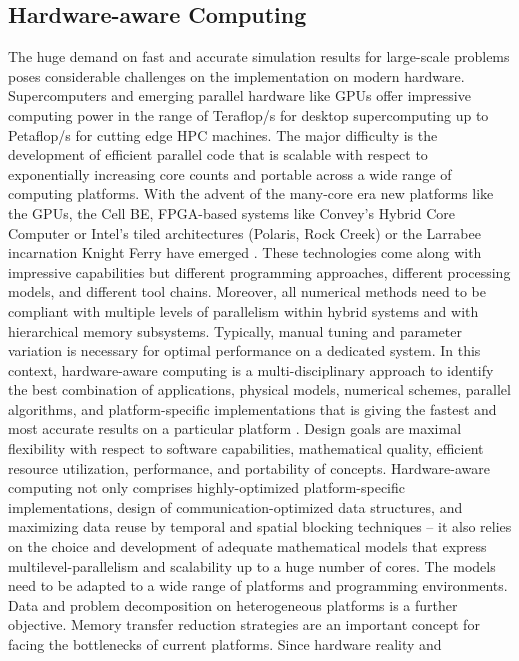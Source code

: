 \subsection{Hardware-aware Computing}
The huge demand on fast and accurate simulation results for
large-scale problems poses considerable challenges on the
implementation on modern hardware.  Supercomputers and emerging
parallel hardware like GPUs offer
impressive computing power in the range of Teraflop/s for desktop
supercomputing up to Petaflop/s for cutting edge HPC machines. The
major difficulty is the development of efficient parallel code that is
scalable with respect to exponentially increasing core counts and
portable across a wide range of computing platforms. With the advent
of the many-core era new platforms like the GPUs, the Cell BE,
FPGA-based systems like Convey's Hybrid Core Computer or Intel's tiled
architectures (Polaris, Rock Creek) or the Larrabee incarnation Knight
Ferry have emerged \cite{Convey,williams2,Luk,Oboril10,Schmidtobreick10,williams1,williams3}.
These technologies come along with impressive
capabilities but different programming approaches, different
processing models, and different tool chains. Moreover, all numerical
methods need to be compliant with multiple levels of parallelism
within hybrid systems and with hierarchical memory
subsystems. Typically, manual tuning and parameter variation is
necessary for optimal performance on a dedicated system. In this
context, hardware-aware computing is a multi-disciplinary approach to
identify the best combination of applications, physical models,
numerical schemes, parallel algorithms, and platform-specific
implementations that is giving the fastest and most accurate results
on a particular platform \cite{HAC}. Design goals are maximal
flexibility with respect to software capabilities, mathematical
quality, efficient resource utilization, performance, and portability
of concepts. Hardware-aware computing not only comprises
highly-optimized platform-specific implementations, design of
communication-optimized data structures, and maximizing data reuse by
temporal and spatial blocking techniques – it also relies on the
choice and development of adequate mathematical models that express
multilevel-parallelism and scalability up to a huge number of
cores. The models need to be adapted to a wide range of platforms and
programming environments. Data and problem decomposition on
heterogeneous platforms is a further objective. Memory transfer
reduction strategies are an important concept for facing the
bottlenecks of current platforms. Since hardware reality and
